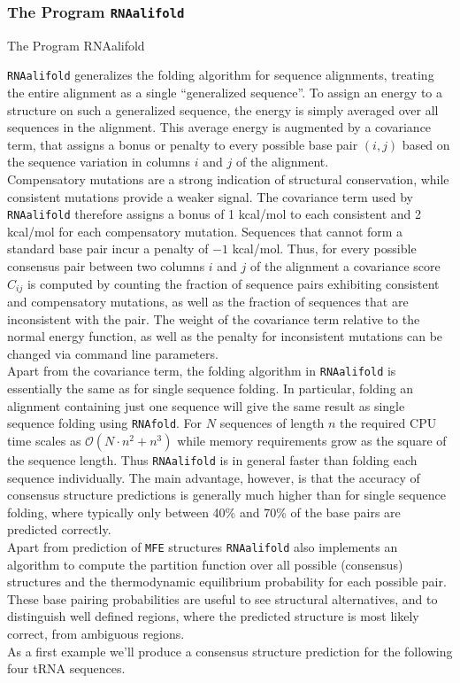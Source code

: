 \documentclass[]{article}
\begin{document}
\subsubsection{The Program \texttt{RNAalifold}}{The Program RNAalifold}\label{the-program-rnaalifold}

\texttt{RNAalifold} generalizes the folding algorithm for sequence
alignments, treating the entire alignment as a single ``generalized
sequence''. To assign an energy to a structure on such a generalized
sequence, the energy is simply averaged over all sequences in the
alignment. This average energy is augmented by a covariance term, that
assigns a bonus or penalty to every possible base pair
\(\left( {i,j} \right)\) based on the sequence variation in columns
\(i\) and \(j\) of the alignment.\\
Compensatory mutations are a strong indication of structural
conservation, while consistent mutations provide a weaker signal. The
covariance term used by \texttt{RNAalifold} therefore assigns a bonus of
1 kcal/mol to each consistent and 2 kcal/mol for each compensatory
mutation. Sequences that cannot form a standard base pair incur a
penalty of \(- 1\) kcal/mol. Thus, for every possible consensus pair
between two columns \(i\) and \(j\) of the alignment a covariance score
\(C_{ij}\) is computed by counting the fraction of sequence pairs
exhibiting consistent and compensatory mutations, as well as the
fraction of sequences that are inconsistent with the pair. The weight of
the covariance term relative to the normal energy function, as well as
the penalty for inconsistent mutations can be changed via command line
parameters.\\
 Apart from the covariance term, the folding algorithm in
\texttt{RNAalifold} is essentially the same as for single sequence
folding. In particular, folding an alignment containing just one
sequence will give the same result as single sequence folding using
\texttt{RNAfold}. For \(N\) sequences of length \(n\) the required CPU
time scales as
\(\mathcal{\mathcal{O}}\left( {N \cdot n^{2} + n^{3}} \right)\) while
memory requirements grow as the square of the sequence length. Thus
\texttt{RNAalifold} is in general faster than folding each sequence
individually. The main advantage, however, is that the accuracy of
consensus structure predictions is generally much higher than for single
sequence folding, where typically only between 40\% and 70\% of the base
pairs are predicted correctly.\\
 Apart from prediction of \texttt{MFE} structures \texttt{RNAalifold}
also implements an algorithm to compute the partition function over all
possible (consensus) structures and the thermodynamic equilibrium
probability for each possible pair. These base pairing probabilities are
useful to see structural alternatives, and to distinguish well defined
regions, where the predicted structure is most likely correct, from
ambiguous regions.\\
 As a first example we'll produce a consensus structure prediction for
the following four tRNA sequences.
\end{document}
